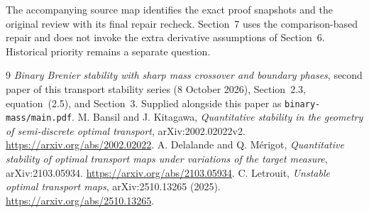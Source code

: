 The accompanying source map identifies the exact proof snapshots and the original review with its final repair recheck. Section~7 uses the comparison-based repair and does not invoke the extra derivative assumptions of Section~6. Historical priority remains a separate question.

\begin{thebibliography}{9}
\small
{} \emph{Binary Brenier stability with sharp mass crossover and boundary phases}, second paper of this transport stability series (8 October 2026), Section~2.3, equation~(2.5), and Section~3. Supplied alongside this paper as \nolinkurl{binary-mass/main.pdf}.
 M. Bansil and J. Kitagawa, \emph{Quantitative stability in the geometry of semi-discrete optimal transport}, arXiv:2002.02022v2. \url{https://arxiv.org/abs/2002.02022}.
 A. Delalande and Q. M\'erigot, \emph{Quantitative stability of optimal transport maps under variations of the target measure}, arXiv:2103.05934. \url{https://arxiv.org/abs/2103.05934}.
 C. Letrouit, \emph{Unstable optimal transport maps}, arXiv:2510.13265 (2025). \url{https://arxiv.org/abs/2510.13265}.
\end{thebibliography}
